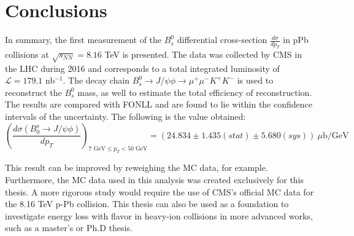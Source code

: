 \chapter[\leavevmode\newline Conclusions]{Conclusions}
\label{chap:Chapter_6}
In summary, the first measurement of the $B^0_s$ differential cross-section $\frac{d\sigma}{dp_T}$ in pPb collisions at $\sqrt{s_{NN}} = 8.16$ TeV is presented. The data was collected by CMS in the LHC during 2016 and corresponds to a total integrated luminosity of $\mathcal L = 179.1$ nb$^{-1}$. The decay chain $B^0_s \to J/\psi \phi \to \mu^{+}\mu^{-} K^{+}K^{-}$ is used to reconstruct the $B^0_s$ mass, as well to estimate the total efficiency of reconstruction. The results are compared with FONLL and are found to lie within the confidence intervals of the uncertainty. The following is the value obtained:
\begin{equation}\left(\frac{d \sigma(B_0^s \to J/\psi\phi)}{dp_T} \right)_{ 7 \text{ GeV} \leq p_T < 50 \text{ GeV}} = (24.834 \pm 1.435(stat) \pm 5.680(sys)) \ \mu\text{b}/\text{GeV}
\end{equation}

This result can be improved by reweighing the MC data, for example. Furthermore, the MC data used in this analysis was created exclusively for this thesis. A more rigorous study would require the use of CMS's official MC data for the 8.16 TeV p-Pb collision. This thesis can also be used as a foundation to investigate energy loss with flavor in heavy-ion collisions in more advanced works, such as a master's or Ph.D thesis.